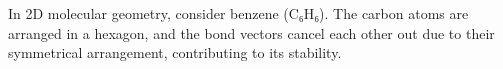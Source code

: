 \documentclass[preview]{standalone}
\begin{document}
\begin{center}
In 2D molecular geometry, consider benzene (C₆H₆). The carbon atoms are arranged in a hexagon, and the bond vectors cancel each other out due to their symmetrical arrangement, contributing to its stability.
\end{center}
\end{document}
